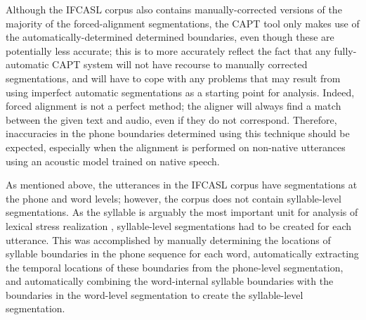 	
	
	 Although the IFCASL corpus also contains manually-corrected versions of the majority of the forced-alignment segmentations,
	the CAPT tool only makes use of the automatically-determined determined boundaries, even though these are potentially less accurate; 
	this is to more accurately reflect the fact that any fully-automatic CAPT system will not have recourse to manually corrected segmentations, and will have to cope with any problems that may result from using imperfect automatic segmentations as a starting point for analysis.
	Indeed, 
	forced alignment is not a perfect method;  the aligner will always find a match between the given text and audio, even if they do not correspond.  
	Therefore, inaccuracies in the phone boundaries determined using this technique should be expected, especially when the alignment is performed on non-native utterances using an acoustic model trained on native speech.
	
	
	As mentioned above, the utterances in the IFCASL corpus have %
	segmentations at the phone and word levels; however, the corpus does not contain syllable-level segmentations.
	As the syllable is arguably the most important unit for analysis of lexical stress realization , syllable-level segmentations had to be created for each utterance. This was accomplished by 
	 manually determining the locations of syllable boundaries in the phone sequence for each word, 		%
	 automatically extracting the temporal locations of these %
	 boundaries
	 from the phone-level segmentation, 
	 and automatically combining the word-internal syllable boundaries with the boundaries in the word-level segmentation to create the syllable-level segmentation. 


